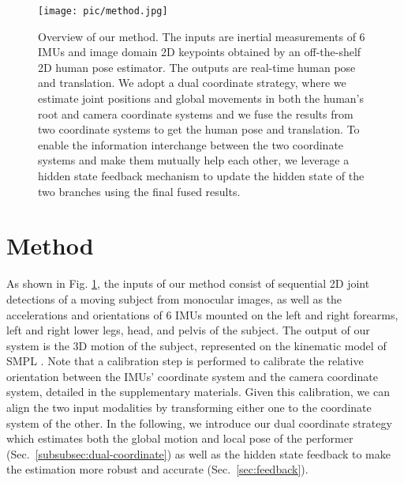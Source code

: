 \begin{figure}
  \texttt{[image: pic/method.jpg]}
  \caption{Overview of our method. The inputs are inertial measurements of 6 IMUs and image domain 2D keypoints obtained by an off-the-shelf 2D human pose estimator. The outputs are real-time human pose and translation. We adopt a dual coordinate strategy, where we estimate joint positions and global movements in both the human's root and camera coordinate systems and we fuse the results from two coordinate systems to get the human pose and translation. To enable the information interchange between the two coordinate systems and make them mutually help each other, we leverage a hidden state feedback mechanism to update the hidden state of the two branches using the final fused results. %
  }
  \label{fig:pipeline}
\end{figure}
\section{Method}
%
As shown in Fig. \ref{fig:pipeline}, the inputs of our method consist of sequential 2D joint detections of a moving subject from monocular images, as well as the accelerations and orientations of 6 IMUs mounted on the left and right forearms, left and right lower legs, head, and pelvis of the subject.
%
The output of our system is the 3D motion of the subject, represented on the kinematic model of SMPL \cite{SMPL}.
%
Note that a calibration step is performed to calibrate the relative orientation between the IMUs' coordinate system and the camera coordinate system, detailed in the supplementary materials.
%
Given this calibration, we can align the two input modalities by transforming either one to the coordinate system of the other.
%
In the following, we introduce our dual coordinate strategy which estimates both the global motion and local pose of the performer (Sec.~\ref{subsubsec:dual-coordinate}) as well as the hidden state feedback to make the estimation more robust and accurate (Sec.~\ref{sec:feedback}).
%
